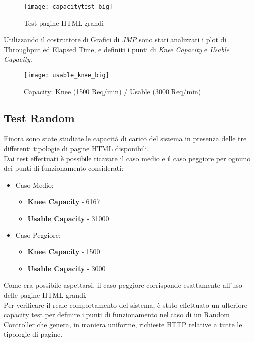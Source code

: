 \begin{figure}[!htbp]
  \centering
  \texttt{[image: capacitytest\_big]}
  \caption{Test pagine HTML grandi}
  \label{big_page_summary_report}
\end{figure}

Utilizzando il costruttore di Grafici di \textit{JMP} sono stati analizzati i plot
di Throughput ed Elapsed Time, e definiti i punti di \textit{Knee Capacity} e
\textit{Usable Capacity}.\\

\clearpage

\begin{figure}[!htbp]
  \centering
  \texttt{[image: usable\_knee\_big]}
  \caption{Capacity: Knee (1500 Req/min) / Usable (3000 Req/min)}
\end{figure}

\subsection{Test Random}
Finora sono state studiate le capacità di carico del sistema in presenza delle
tre differenti tipologie di pagine HTML disponibili.\\
Dai test effettuati è possibile ricavare il caso medio e il caso peggiore per
ognuno dei punti di funzionamento considerati:
\begin{itemize}
  \item Caso Medio:
  \begin{itemize}
    \item \textbf{Knee Capacity} - 6167
    \item \textbf{Usable Capacity} - 31000
  \end{itemize}
  \item Caso Peggiore:
  \begin{itemize}
    \item \textbf{Knee Capacity} - 1500
    \item \textbf{Usable Capacity} - 3000
  \end{itemize}
\end{itemize}

Come era possibile aspettarsi, il caso peggiore corrisponde esattamente all'uso
delle pagine HTML grandi.\\

Per verificare il reale comportamento del sistema, è stato effettuato un ulteriore
capacity test per definire i punti di funzionamento nel caso di un Random Controller
che genera, in maniera uniforme, richieste HTTP relative a tutte le tipologie di
pagine.\\


